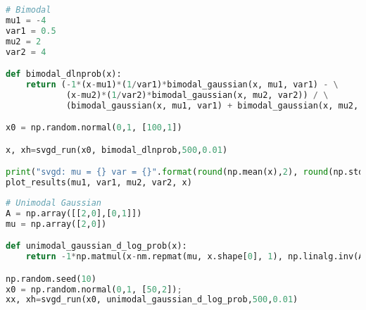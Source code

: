 \documentclass[11pt]{isr} %
\begin{document}
\begin{lstlisting}[language=Python, caption={Bimodal Gaussian Example}, label=code:bimodal]
# Bimodal 
mu1 = -4
var1 = 0.5
mu2 = 2
var2 = 4

def bimodal_dlnprob(x):
    return (-1*(x-mu1)*(1/var1)*bimodal_gaussian(x, mu1, var1) - \
            (x-mu2)*(1/var2)*bimodal_gaussian(x, mu2, var2)) / \
            (bimodal_gaussian(x, mu1, var1) + bimodal_gaussian(x, mu2, var2))

x0 = np.random.normal(0,1, [100,1])

x, xh=svgd_run(x0, bimodal_dlnprob,500,0.01)

print("svgd: mu = {} var = {}".format(round(np.mean(x),2), round(np.std(x)**2,2)))
plot_results(mu1, var1, mu2, var2, x)

\end{lstlisting}

\begin{lstlisting}[language=Python, caption={2D Unimodal Gaussian}, label=code:uniG]
# Unimodal Gaussian 
A = np.array([[2,0],[0,1]])
mu = np.array([2,0])

def unimodal_gaussian_d_log_prob(x):
    return -1*np.matmul(x-nm.repmat(mu, x.shape[0], 1), np.linalg.inv(A))

np.random.seed(10)
x0 = np.random.normal(0,1, [50,2]);
xx, xh=svgd_run(x0, unimodal_gaussian_d_log_prob,500,0.01)
\end{lstlisting}
\end{document}
